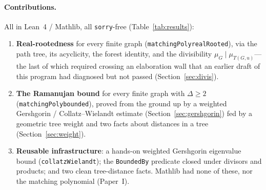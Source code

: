 \documentclass[11pt]{article}
\newcommand{\lean}[1]{{\def\_{\textunderscore\allowbreak}\texttt{#1}}}
\begin{document}
\paragraph{Contributions.} All in Lean~4 / Mathlib, all \lean{sorry}-free
(Table~\ref{tab:results}):
\begin{enumerate}\itemsep2pt
\item \textbf{Real-rootedness} for every finite graph
  (\lean{matchingPoly\_realRooted}), via the path tree, its acyclicity, the forest
  identity, and the divisibility $\mu_G\mid\mu_{T(G,u)}$---the last of which
  required crossing an elaboration wall that an earlier draft of this program had
  diagnosed but not passed (Section~\ref{sec:divis}).
\item \textbf{The Ramanujan bound} for every finite graph with $\Delta\ge2$
  (\lean{matchingPoly\_bounded}), proved from the ground up by a weighted
  Gershgorin / Collatz--Wielandt estimate (Section~\ref{sec:gershgorin}) fed by a
  geometric tree weight and two facts about distances in a tree
  (Section~\ref{sec:weight}).
\item \textbf{Reusable infrastructure}: a hands-on weighted Gershgorin eigenvalue
  bound (\lean{collatzWielandt}); the \lean{BoundedBy} predicate closed under
  divisors and products; and two clean tree-distance facts. Mathlib had none of
  these, nor the matching polynomial (Paper~I).
\end{enumerate}
\end{document}
